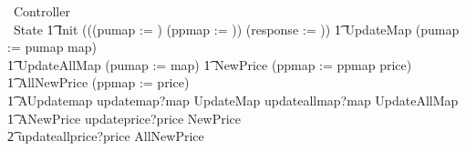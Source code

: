 \begin{circus}
	\circprocess\ Controller \circdef \circbegin \\
%
    	\circstate\ State %
    	\t1	Init \circdef (((pumap := \emptyset) \circseq (ppmap := \emptyset)) \circseq (response := \emptyset))
        \t1 UpdateMap \circdef (pumap := pumap \oplus map)\\
        \t1 UpdateAllMap \circdef (pumap := map)
        \t1 NewPrice \circdef (ppmap := ppmap \oplus price)\\
        \t1 AllNewPrice \circdef (ppmap := price)\\
        \t1 AUpdatemap \circdef updatemap?map \then UpdateMap  \extchoice updateallmap?map \then UpdateAllMap \\
        \t1 ANewPrice \circdef updateprice?price \then NewPrice \\
            \t2 \extchoice updateallprice?price \then AllNewPrice \\

\end{circus}
